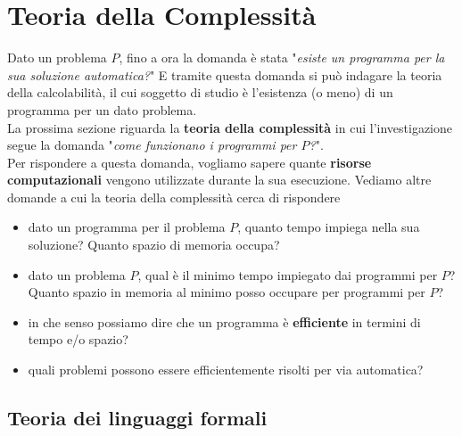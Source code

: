 
\chapter{Teoria della Complessità}

Dato un problema $P$, fino a ora la domanda è stata "\textit{esiste un programma per la sua soluzione automatica?}" E tramite questa domanda si può indagare la teoria della calcolabilità, il cui soggetto di studio è l'esistenza (o meno) di un programma per un dato problema.\\

La prossima sezione riguarda la \textbf{teoria della complessità} in cui l'investigazione segue la domanda "\textit{come funzionano i programmi per $P$?}".\\

Per rispondere a questa domanda, vogliamo sapere quante \textbf{risorse computazionali} vengono utilizzate durante la sua esecuzione. Vediamo altre domande a cui la teoria della complessità cerca di rispondere
\begin{itemize}
	\item dato un programma per il problema $P$, quanto tempo impiega nella sua soluzione? Quanto spazio di memoria occupa? 
	\item dato un problema $P$, qual è il minimo tempo impiegato dai programmi per $P$? Quanto spazio in memoria al minimo posso occupare per programmi per $P$? 
	\item in che senso possiamo dire che un programma è \textbf{efficiente} in termini di tempo e/o spazio? 
	\item quali problemi possono essere efficientemente risolti per via automatica?
\end{itemize}

\section{Teoria dei linguaggi formali}

